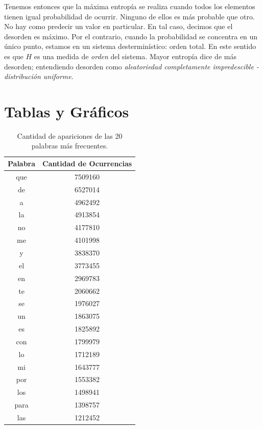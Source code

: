 
Tenemos entonces que la m\'axima entrop\'ia se realiza cuando todos los elementos tienen igual probabilidad de ocurrir. Ninguno de ellos es m\'as probable que otro. No hay como predecir un valor en particular. En tal caso, decimos que el desorden es m\'aximo. Por el contrario, cuando la probabilidad se concentra en un \'unico punto, estamos en un sistema destermin\'istico: orden total. En este sentido es que $H$ es una medida de \textit{orden} del sistema. Mayor entrop\'ia dice de m\'as desorden; entendiendo desorden como \textit{aleatoriedad completamente impredescible - distribuci\'on  uniforme}.  


\section{Tablas y Gráficos}
\label{sub:tablas}


\begin{table}[ht]
\centering

\begin{tabular}{ c c }
\toprule
Palabra & Cantidad de Ocurrencias \\ 
\midrule
que     & 7509160                 \\
de      & 6527014                 \\
a       & 4962492                 \\
la      & 4913854                 \\
no      & 4177810                 \\
me      & 4101998                 \\
y       & 3838370                 \\
el      & 3773455                 \\
en      & 2969783                 \\
te      & 2060662                 \\
se      & 1976027                 \\
un      & 1863075                 \\
es      & 1825892                 \\
con     & 1799979                 \\
lo      & 1712189                 \\
mi      & 1643777                 \\
por     & 1553382                 \\
los     & 1498941                 \\
para    & 1398757                 \\
las     & 1212452                 \\
\bottomrule
\end{tabular}
\caption{Cantidad de apariciones de las 20 palabras más frecuentes.}
\label{tab:palabrasMasOcurrentes}
\end{table}


